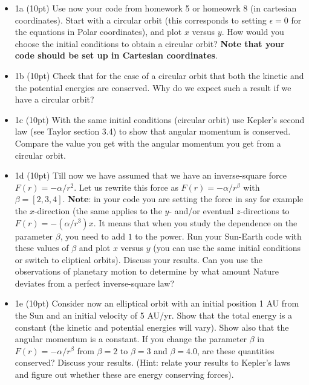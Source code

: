 \documentclass[%
oneside,                 %
final,                   %
10pt]{article}
\begin{document}
\begin{itemize}
\item 1a (10pt) Use now your code from homework 5 or homeowrk 8 (in cartesian coordinates). Start with a circular orbit (this corresponds to  setting $\epsilon=0$ for the equations in Polar coordinates), and plot $x$ versus $y$. How would you choose the initial conditions to obtain a circular orbit?  \textbf{Note that your code should be set up  in Cartesian coordinates}.

\item 1b (10pt) Check that for the case of a circular orbit that both the kinetic and the potential energies are conserved. Why do we expect such a result if we have a circular orbit? 

\item 1c (10pt) With the same initial conditions (circular orbit) use Kepler's second law (see Taylor section 3.4) to show that angular momentum is conserved. Compare the value you get with the angular momentum you get from a circular orbit. 

\item 1d (10pt) Till now we have assumed that we have an inverse-square force $F(r) = -\alpha/r^2$. Let us rewrite this force as $F(r) =-\alpha/r^{\beta}$ with $\beta=[2,3,4]$. \textbf{Note}: in your code you are setting the force in say for example the $x$-direction (the same applies to the $y$- and/or eventual $z$-directions to $F(r) = -(\alpha/r^3)x$. It means that when you study the dependence on the parameter $\beta$, you need to add $1$ to the power. Run your Sun-Earth code with these values of $\beta$ and plot $x$ versus $y$ (you can use the same initial conditions or switch to eliptical orbits). Discuss your results. Can you use the observations of planetary motion to determine by what amount Nature deviates from a perfect inverse-square law? 

\item 1e (10pt) Consider now an elliptical orbit with an initial position 1 AU from the Sun and an initial  velocity of 5 AU/yr. Show that the total energy is a constant (the kinetic and potential energies will vary). Show also that the angular momentum is a constant. If you change the parameter $\beta$ in $F(r) = -\alpha/r^{\beta}$ from $\beta=2$ to $\beta=3$ and $\beta =4.0$, are these quantities conserved?  Discuss your results. (Hint: relate your results to Kepler's laws and figure out whether these are energy conserving forces). 
\end{itemize}
\end{document}
